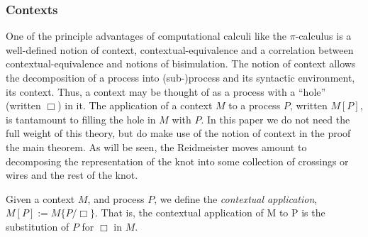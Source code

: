 
\subsubsection{Contexts}

One of the principle advantages of computational calculi like the
$\pi$-calculus is a well-defined notion of context,
contextual-equivalence and a correlation between
contextual-equivalence and notions of bisimulation. The notion of
context allows the decomposition of a process into (sub-)process and
its syntactic environment, its context. Thus, a context may be
thought of as a process with a ``hole'' (written $\Box$) in it. The
application of a context $M$ to a process $P$, written $M[P]$, is
tantamount to filling the hole in $M$ with $P$. In this paper we do
not need the full weight of this theory, but do make use of the notion
of context in the proof the main theorem. As will be seen, the
Reidmeister moves amount to decomposing the representation of the knot
into some collection of crossings or wires and the rest of the
knot.


\begin{definition} Given a context $M$, and
  process $P$, we define the \emph{contextual application}, $M[P] :=
  M\{P/\Box\}$. That is, the contextual application of M to P is the
  substitution of $P$ for $\Box$ in $M$.
\end{definition}

